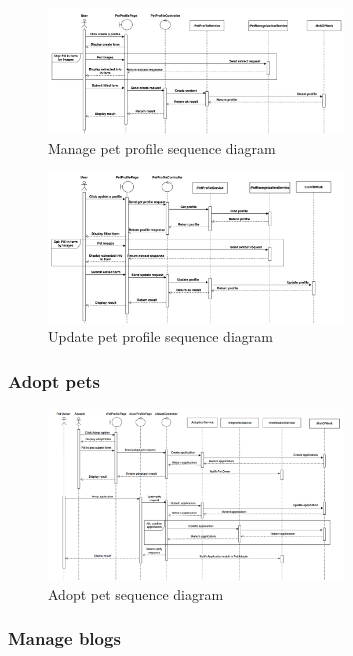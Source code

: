 \begin{figure}[H]
    \centering
    \includegraphics[angle=-90,width=0.7\textwidth]{Figures/manage_pet_seq.png}
    \caption{Manage pet profile sequence diagram}
    \label{fig:manage-pet-seq}
\end{figure}
\clearpage
\begin{figure}[H]
    \centering
    \includegraphics[angle=-90,width=0.7\textwidth]{Figures/update_pet_profile_seq.png}
    \caption{Update pet profile sequence diagram}
    \label{fig:access-pet-seq}
\end{figure}
\clearpage

\subsubsection*{Adopt pets}
\begin{figure}[H]
    \centering
    \includegraphics[angle=-90,width=0.7\textwidth]{Figures/adopt_pet_seq.png}
    \caption{Adopt pet sequence diagram}
    \label{fig:adopt-pet-seq}
\end{figure}
\clearpage

\subsubsection{Manage blogs}

